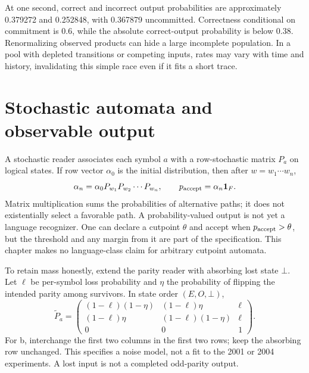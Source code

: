 \begin{center}\end{center}
At one second, correct and incorrect output probabilities are approximately
0.379272 and 0.252848, with 0.367879 uncommitted. Correctness conditional on
commitment is $0.6$, while the absolute correct-output probability is below
$0.38$. Renormalizing observed products can hide a large incomplete population.
In a pool with depleted transitions or competing inputs, rates may vary with
time and history, invalidating this simple race even if it fits a short trace.

\section{Stochastic automata and observable output}
A stochastic reader associates each symbol $a$ with a row-stochastic matrix
$P_a$ on logical states. If row vector $\alpha_0$ is the initial distribution,
then after $w=w_1\cdots w_n$,
\begin{equation}
 \alpha_n=\alpha_0P_{w_1}P_{w_2}\cdots P_{w_n},\qquad
 p_{\rm accept}=\alpha_n\boldsymbol{1}_F.
\end{equation}
Matrix multiplication sums the probabilities of alternative paths; it does
not existentially select a favorable path. A probability-valued output is not
yet a language recognizer. One can declare a cutpoint $\theta$ and accept
when $p_{\rm accept}>\theta$, but the threshold and any margin from it are
part of the specification. This chapter makes no language-class claim for
arbitrary cutpoint automata.

To retain mass honestly, extend the parity reader with absorbing lost state
$\bot$. Let $\ell$ be per-symbol loss probability and $\eta$ the probability
of flipping the intended parity among survivors. In state order $(E,O,\bot)$,
\begin{equation}
 \widetilde P_a=
 \begin{pmatrix}
 (1-\ell)(1-\eta)&(1-\ell)\eta&\ell\\
 (1-\ell)\eta&(1-\ell)(1-\eta)&\ell\\
 0&0&1
 \end{pmatrix}.
\end{equation}
For b, interchange the first two columns in the first two rows; keep the
absorbing row unchanged. This specifies a noise model, not a fit to the
2001 or 2004 experiments. A lost input is not a completed odd-parity output.

